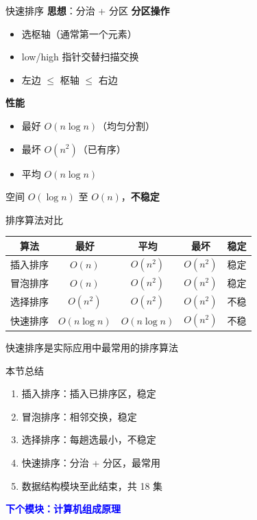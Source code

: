 \documentclass[10pt, aspectratio=169]{beamer}
\begin{document}
\begin{frame}{快速排序}
\textbf{思想}：分治 + 分区
\vspace{0.3em}
\textbf{分区操作}
\begin{itemize}
\item 选枢轴（通常第一个元素）
\item low/high 指针交替扫描交换
\item 左边 $\le$ 枢轴 $\le$ 右边
\end{itemize}
\vspace{0.3em}
\textbf{性能}
\begin{itemize}
\item 最好 $O(n\log n)$（均匀分割）
\item 最坏 $O(n^2)$（已有序）
\item 平均 $O(n\log n)$
\end{itemize}
空间 $O(\log n)$ 至 $O(n)$，\textbf{不稳定}
\end{frame}
\begin{frame}{排序算法对比}
\begin{tabular}{|c|c|c|c|c|}
\hline 算法 & 最好 & 平均 & 最坏 & 稳定 \\ \hline
插入排序 & $O(n)$ & $O(n^2)$ & $O(n^2)$ & 稳定 \\ \hline
冒泡排序 & $O(n)$ & $O(n^2)$ & $O(n^2)$ & 稳定 \\ \hline
选择排序 & $O(n^2)$ & $O(n^2)$ & $O(n^2)$ & 不稳 \\ \hline
快速排序 & $O(n\log n)$ & $O(n\log n)$ & $O(n^2)$ & 不稳 \\ \hline
\end{tabular}
\vspace{0.5em}
快速排序是实际应用中最常用的排序算法
\end{frame}
\begin{frame}{本节总结}
\begin{enumerate}
\item 插入排序：插入已排序区，稳定
\item 冒泡排序：相邻交换，稳定
\item 选择排序：每趟选最小，不稳定
\item 快速排序：分治 + 分区，最常用
\item 数据结构模块至此结束，共 18 集
\end{enumerate}
\vspace{1em}
\begin{center}
\textcolor{blue}{\textbf{下个模块：计算机组成原理}}
\end{center}
\end{frame}
\end{document}

